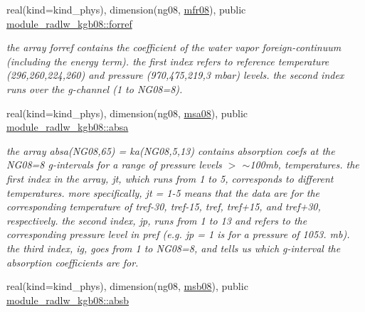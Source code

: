 \begin{DoxyCompactItemize}
\mbox{\label{group__module__radlw__kgbnn_ga8427ec5170f6a61a008a8580be6fe5ec}} 
real(kind=kind\+\_\+phys), dimension(ng08, \hyperlink{group__module__radlw__kgbnn_gabfaf0cad62f8ae42564f8127198d48f0}{mfr08}), public \hyperlink{group__module__radlw__kgbnn_ga8427ec5170f6a61a008a8580be6fe5ec}{module\+\_\+radlw\+\_\+kgb08\+::forref}
\begin{DoxyCompactList}\small\item\em the array forref contains the coefficient of the water vapor foreign-\/continuum (including the energy term). the first index refers to reference temperature (296,260,224,260) and pressure (970,475,219,3 mbar) levels. the second index runs over the g-\/channel (1 to N\+G08=8). \end{DoxyCompactList}\item 
\mbox{\label{group__module__radlw__kgbnn_gaba1018958264bbc6fbf7f190fea91fa5}} 
real(kind=kind\+\_\+phys), dimension(ng08, \hyperlink{namespacemodule__radlw__kgb08_a74e4bd8f4b00d0ff6bae1a39d9bddd3b}{msa08}), public \hyperlink{group__module__radlw__kgbnn_gaba1018958264bbc6fbf7f190fea91fa5}{module\+\_\+radlw\+\_\+kgb08\+::absa}
\begin{DoxyCompactList}\small\item\em the array absa(\+N\+G08,65) = ka(\+N\+G08,5,13) contains absorption coefs at the N\+G08=8 g-\/intervals for a range of pressure levels $>$ $\sim$100mb, temperatures. the first index in the array, jt, which runs from 1 to 5, corresponds to different temperatures. more specifically, jt = 1-\/5 means that the data are for the corresponding temperature of tref-\/30, tref-\/15, tref, tref+15, and tref+30, respectively. the second index, jp, runs from 1 to 13 and refers to the corresponding pressure level in pref (e.\+g. jp = 1 is for a pressure of 1053. mb). the third index, ig, goes from 1 to N\+G08=8, and tells us which g-\/interval the absorption coefficients are for. \end{DoxyCompactList}\item 
\mbox{\label{group__module__radlw__kgbnn_ga23d4352fcafb0394d723e2f080a84ece}} 
real(kind=kind\+\_\+phys), dimension(ng08, \hyperlink{group__module__radlw__kgbnn_ga3dd391fcce47d3aca3512bbfd946807b}{msb08}), public \hyperlink{group__module__radlw__kgbnn_ga23d4352fcafb0394d723e2f080a84ece}{module\+\_\+radlw\+\_\+kgb08\+::absb}

\end{DoxyCompactItemize}
